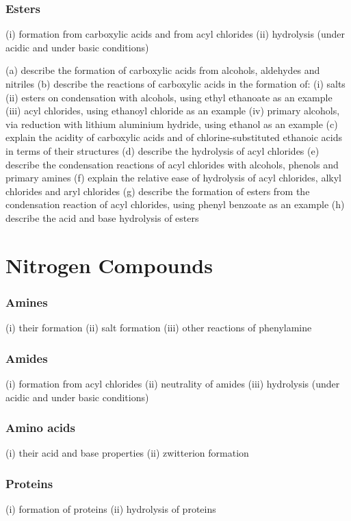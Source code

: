 \documentclass[12pt,a4 paper]{article}
\begin{document}
\section{Esters}
(i) formation from carboxylic acids and from acyl chlorides
(ii) hydrolysis (under acidic and under basic conditions)


(a) describe the formation of carboxylic acids from alcohols, aldehydes and nitriles
(b) describe the reactions of carboxylic acids in the formation of:
(i) salts
(ii) esters on condensation with alcohols, using ethyl ethanoate as an example
(iii) acyl chlorides, using ethanoyl chloride as an example
(iv) primary alcohols, via reduction with lithium aluminium hydride, using ethanol as an example
(c) explain the acidity of carboxylic acids and of chlorine-substituted ethanoic acids in terms of their structures
(d) describe the hydrolysis of acyl chlorides
(e) describe the condensation reactions of acyl chlorides with alcohols, phenols and primary amines
(f) explain the relative ease of hydrolysis of acyl chlorides, alkyl chlorides and aryl chlorides
(g) describe the formation of esters from the condensation reaction of acyl chlorides, using phenyl benzoate as an example
(h) describe the acid and base hydrolysis of esters
\pagebreak

\part{Nitrogen Compounds}
\section{Amines}
(i) their formation
(ii) salt formation
(iii) other reactions of phenylamine
\pagebreak

\section{Amides}
(i) formation from acyl chlorides
(ii) neutrality of amides
(iii) hydrolysis (under acidic and under basic conditions)
\pagebreak

\section{Amino acids}
(i) their acid and base properties
(ii) zwitterion formation
\pagebreak

\section{Proteins}
(i) formation of proteins
(ii) hydrolysis of proteins
\end{document}
